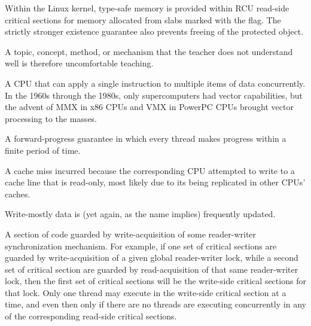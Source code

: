 \begin{description}
	Within the Linux kernel, type-safe memory is provided within
	RCU read-side critical sections for memory allocated from slabs
	marked with the  flag.
	The strictly stronger existence guarantee also prevents freeing
	of the protected object.
\item[\IX{Unteachable}:]
	A topic, concept, method, or mechanism that the teacher does
	not understand well is therefore uncomfortable teaching.
\item[\IXr{Vector CPU}:]
	A CPU that can apply a single instruction to multiple items of
	data concurrently.
	In the 1960s through the 1980s, only supercomputers had vector
	capabilities, but the advent of MMX in x86 CPUs and VMX in
	PowerPC CPUs brought vector processing to the masses.
\item[\IX{Wait Free}:]
	A forward-progress guarantee in which every thread makes
	progress within a finite period of time.
\item[\IXalth{Write Miss}{write}{cache miss}:]
	A cache miss incurred because the corresponding CPU attempted
	to write to a cache line that is read-only, most likely due
	to its being replicated in other CPUs' caches.
\item[\IX{Write Mostly}:]
	Write-mostly data is (yet again, as the name implies) frequently
	updated.
\item[\IXh{Write-Side}{Critical Section}:]
	A section of code guarded by write-acquisition of
	some reader-writer synchronization mechanism.
	For example, if one set of critical sections are guarded by
	write-acquisition of
	a given global reader-writer lock, while a second set of critical
	section are guarded by read-acquisition of that same reader-writer
	lock, then the first set of critical sections will be the
	write-side critical sections for that lock.
	Only one thread may execute in the write-side critical section
	at a time, and even then only if there are no threads are
	executing concurrently in any of the corresponding read-side
	critical sections.
\end{description}
